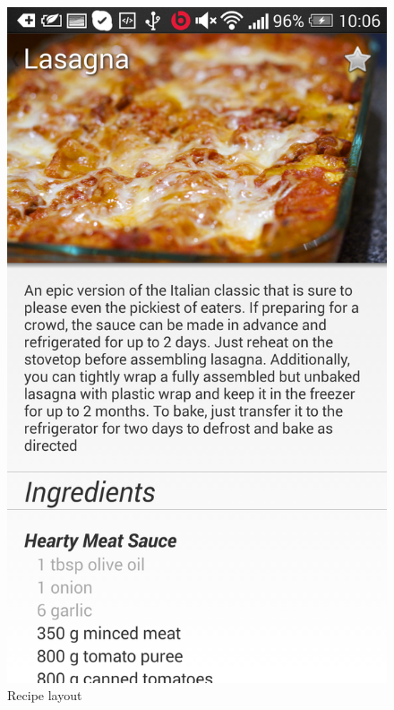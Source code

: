 \begin{figure}[H]
\begin{minipage}[t]{0.5\columnwidth}
\includegraphics[width=0.7\columnwidth]{img/screenshots/finalrecipe1.png}
\caption{Recipe layout\label{fig:recipe1}}
\end{minipage}
\end{figure}

